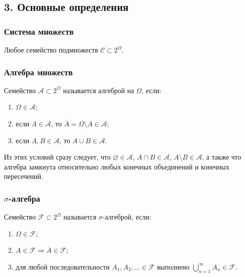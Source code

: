 \documentclass[
  11pt,
  a4paper,
]{article}
\providecommand{\tightlist}{%
  \setlength{\itemsep}{0pt}\setlength{\parskip}{0pt}}
\begin{document}
\subsection{3. Основные
определения}\label{ux43eux441ux43dux43eux432ux43dux44bux435-ux43eux43fux440ux435ux434ux435ux43bux435ux43dux438ux44f}

\subsubsection{Система
множеств}\label{ux441ux438ux441ux442ux435ux43cux430-ux43cux43dux43eux436ux435ux441ux442ux432}

Любое семейство подмножеств \(\mathcal C\subset 2^\Omega\).

\subsubsection{Алгебра
множеств}\label{ux430ux43bux433ux435ux431ux440ux430-ux43cux43dux43eux436ux435ux441ux442ux432}

Семейство \(\mathcal A\subset 2^\Omega\) называется алгеброй на
\(\Omega\), если:

\begin{enumerate}
\def\labelenumi{\arabic{enumi}.}
\tightlist
\item
  \(\Omega\in\mathcal A\);
\item
  если \(A\in\mathcal A\), то
  \(\overline{A}=\Omega\setminus A\in\mathcal A\);
\item
  если \(A,B\in\mathcal A\), то \(A\cup B\in\mathcal A\).
\end{enumerate}

Из этих условий сразу следует, что \(\varnothing\in\mathcal A\),
\(A\cap B\in\mathcal A\), \(A\setminus B\in\mathcal A\), а также что
алгебра замкнута относительно любых конечных объединений и конечных
пересечений.

\subsubsection{\texorpdfstring{\(\sigma\)-алгебра}{\textbackslash sigma-алгебра}}\label{sigma-ux430ux43bux433ux435ux431ux440ux430}

Семейство \(\mathcal F\subset 2^\Omega\) называется \(\sigma\)-алгеброй,
если:

\begin{enumerate}
\def\labelenumi{\arabic{enumi}.}
\tightlist
\item
  \(\Omega\in\mathcal F\);
\item
  \(A\in\mathcal F\Rightarrow \overline{A}\in\mathcal F\);
\item
  для любой последовательности \(A_1,A_2,\ldots\in\mathcal F\) выполнено
  \(\bigcup_{n=1}^{\infty}A_n\in\mathcal F\).
\end{enumerate}
\end{document}

